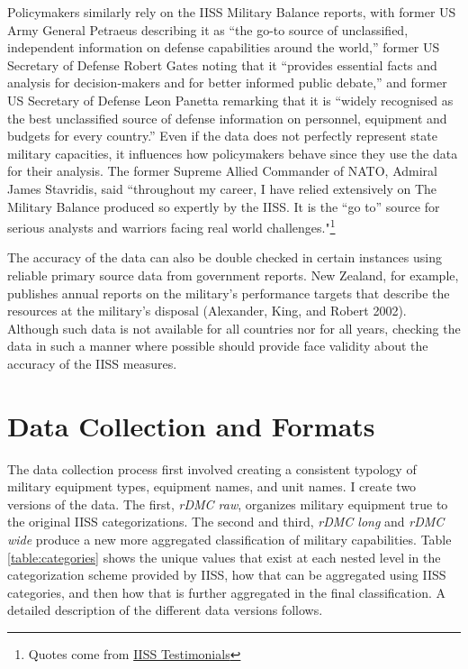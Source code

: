 \documentclass[
]{article}
\begin{document}
Policymakers similarly rely on the IISS Military Balance reports, with former US Army General Petraeus describing it as ``the go-to source of unclassified, independent information on defense capabilities around the world,'' former US Secretary of Defense Robert Gates noting that it ``provides essential facts and analysis for decision-makers and for better informed public debate,'' and former US Secretary of Defense Leon Panetta remarking that it is ``widely recognised as the best unclassified source of defense information on personnel, equipment and budgets for every country.'' Even if the data does not perfectly represent state military capacities, it influences how policymakers behave since they use the data for their analysis. The former Supreme Allied Commander of NATO, Admiral James Stavridis, said ``throughout my career, I have relied extensively on The Military Balance produced so expertly by the IISS. It is the ``go to'' source for serious analysts and warriors facing real world challenges."\footnote{Quotes come from \href{https://www.iiss.org/publications/the-military-balance}{IISS Testimonials}}

The accuracy of the data can also be double checked in certain instances using reliable primary source data from government reports. New Zealand, for example, publishes annual reports on the military's performance targets that describe the resources at the military's disposal (Alexander, King, and Robert 2002). Although such data is not available for all countries nor for all years, checking the data in such a manner where possible should provide face validity about the accuracy of the IISS measures.

\hypertarget{data-collection-and-formats}{%
\section{Data Collection and Formats}\label{data-collection-and-formats}}

The data collection process first involved creating a consistent typology of military equipment types, equipment names, and unit names. I create two versions of the data. The first, \textit{rDMC raw}, organizes military equipment true to the original IISS categorizations. The second and third, \textit{rDMC long} and \textit{rDMC wide} produce a new more aggregated classification of military capabilities. Table \ref{table:categories} shows the unique values that exist at each nested level in the categorization scheme provided by IISS, how that can be aggregated using IISS categories, and then how that is further aggregated in the final classification. A detailed description of the different data versions follows.
\end{document}
